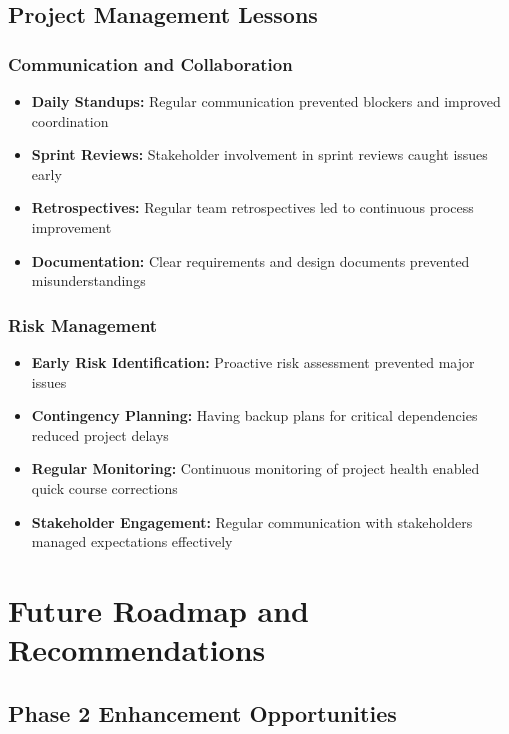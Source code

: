 \documentclass[12pt,a4paper]{article}
\begin{document}
\subsection{Project Management Lessons}

\subsubsection{Communication and Collaboration}
\begin{itemize}
    \item \textbf{Daily Standups:} Regular communication prevented blockers and improved coordination
    \item \textbf{Sprint Reviews:} Stakeholder involvement in sprint reviews caught issues early
    \item \textbf{Retrospectives:} Regular team retrospectives led to continuous process improvement
    \item \textbf{Documentation:} Clear requirements and design documents prevented misunderstandings
\end{itemize}

\subsubsection{Risk Management}
\begin{itemize}
    \item \textbf{Early Risk Identification:} Proactive risk assessment prevented major issues
    \item \textbf{Contingency Planning:} Having backup plans for critical dependencies reduced project delays
    \item \textbf{Regular Monitoring:} Continuous monitoring of project health enabled quick course corrections
    \item \textbf{Stakeholder Engagement:} Regular communication with stakeholders managed expectations effectively
\end{itemize}

\section{Future Roadmap and Recommendations}

\subsection{Phase 2 Enhancement Opportunities}
\end{document}
